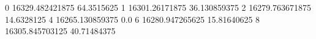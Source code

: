 0 16329.482421875 64.3515625
1 16301.26171875 36.130859375
2 16279.763671875 14.6328125
4 16265.130859375 0.0
6 16280.947265625 15.81640625
8 16305.845703125 40.71484375
